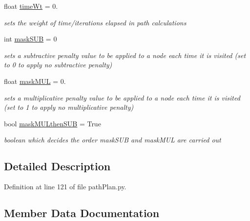 \begin{DoxyCompactItemize}
float \mbox{\hyperlink{classpath_plan_1_1_path_planner_1_1params_aca35113628a0f6ca96f5a1d576e74203}{time\+Wt}} = 0.
\begin{DoxyCompactList}\small\item\em sets the weight of time/iterations elapsed in path calculations \end{DoxyCompactList}\item 
int \mbox{\hyperlink{classpath_plan_1_1_path_planner_1_1params_a77d0a7a4d564dde6ce911fd1a25fdd31}{mask\+S\+UB}} = 0
\begin{DoxyCompactList}\small\item\em sets a subtractive penalty value to be applied to a node each time it is visited (set to 0 to apply no subtractive penalty) \end{DoxyCompactList}\item 
float \mbox{\hyperlink{classpath_plan_1_1_path_planner_1_1params_a31a755ef7499eac2e90deb944c7f1d38}{mask\+M\+UL}} = 0.
\begin{DoxyCompactList}\small\item\em sets a multiplicative penalty value to be applied to a node each time it is visited (set to 1 to apply no multiplicative penalty) \end{DoxyCompactList}\item 
bool \mbox{\hyperlink{classpath_plan_1_1_path_planner_1_1params_a8fb76a1325335d64cea705cc4efec3e8}{mask\+M\+U\+Lthen\+S\+UB}} = True
\begin{DoxyCompactList}\small\item\em boolean which decides the order mask\+S\+UB and mask\+M\+UL are carried out \end{DoxyCompactList}\end{DoxyCompactItemize}


\subsection{Detailed Description}


Definition at line 121 of file path\+Plan.\+py.



\subsection{Member Data Documentation}
\mbox{\label{classpath_plan_1_1_path_planner_1_1params_a610fb5e919a89498e435fded5291dc1a}} 
